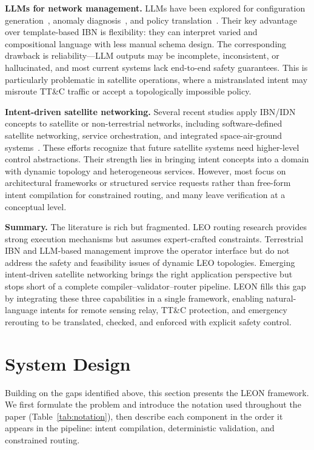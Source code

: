 \documentclass[10pt, conference, letterpaper]{IEEEtran}
\begin{document}
\noindent\textbf{LLMs for network management.}
LLMs have been explored for configuration
generation~\cite{llm_config}, anomaly
diagnosis~\cite{llm_anomaly}, and policy
translation~\cite{llm_policy,netllm,llm_netops}. Their key
advantage over template-based IBN is flexibility: they can interpret
varied and compositional language with less manual schema design.
The corresponding drawback is reliability---LLM outputs may be
incomplete, inconsistent, or hallucinated, and most current systems
lack end-to-end safety guarantees. This is particularly problematic
in satellite operations, where a mistranslated intent may misroute
TT\&C traffic or accept a topologically impossible policy.

\noindent\textbf{Intent-driven satellite networking.}
Several recent studies apply IBN/IDN concepts to satellite or
non-terrestrial networks, including software-defined satellite
networking, service orchestration, and integrated
space-air-ground systems~\cite{satellite_ibn,satellite_idn,ntn_orchestration}.
These efforts recognize that future satellite systems need
higher-level control abstractions. Their strength lies in bringing
intent concepts into a domain with dynamic topology and heterogeneous
services. However, most focus on architectural frameworks or
structured service requests rather than free-form intent compilation
for constrained routing, and many leave verification at a conceptual
level.

\textbf{Summary.} The literature is rich but fragmented. LEO routing
research provides strong execution mechanisms but assumes
expert-crafted constraints. Terrestrial IBN and LLM-based management
improve the operator interface but do not address the safety and
feasibility issues of dynamic LEO topologies. Emerging intent-driven
satellite networking brings the right application perspective but
stops short of a complete compiler--validator--router pipeline. LEON
fills this gap by integrating these three capabilities in a single
framework, enabling natural-language intents for remote sensing relay,
TT\&C protection, and emergency rerouting to be translated, checked,
and enforced with explicit safety control.

\section{System Design}
\label{sec:system}

Building on the gaps identified above, this section presents the
LEON framework. We first formulate the problem and introduce the
notation used throughout the paper (Table~\ref{tab:notation}), then
describe each component in the order it appears in the pipeline:
intent compilation, deterministic validation, and constrained routing.
\end{document}
